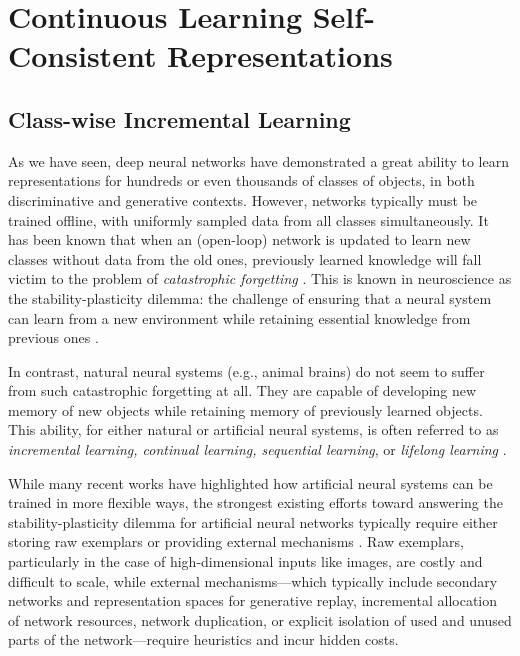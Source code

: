 \documentclass[../../book-main.tex]{subfiles}
\begin{document}
\section{Continuous Learning Self-Consistent Representations}
\label{sec:continuous}

\subsection{Class-wise Incremental Learning}
\label{sec:class-wise-incremental}

As we have seen, deep neural networks have demonstrated a great
ability to learn representations for hundreds or even thousands of
classes of objects, in both discriminative and generative contexts.
However, networks typically must be trained offline, with uniformly
sampled data from all classes simultaneously. It has been known that
when an (open-loop) network is updated to learn new classes without
data from the old ones, previously learned knowledge will fall victim
to the problem of {\em catastrophic forgetting}
\cite{McCloskey1989catastrophic}. This is known in neuroscience as
the stability-plasticity dilemma: the challenge of ensuring that a
neural system can learn from a new environment while retaining
essential knowledge from previous ones \cite{Grossberg1987CompetitiveLF}.

In contrast, natural neural systems (e.g., animal brains) do not seem
to suffer from such catastrophic forgetting at all. They are capable
of developing new memory of new objects while retaining memory of
previously learned objects. This ability, for either natural or
artificial neural systems, is often referred to as {\em incremental
learning, continual learning, sequential learning}, or {\em lifelong
learning} \cite{controlled-forgetting}.

While many recent works have highlighted how artificial neural
systems can be trained in more flexible ways, the strongest existing
efforts toward answering the stability-plasticity dilemma for
artificial neural networks typically require either storing raw
exemplars \cite{icarl,chaudhry2019tiny} or providing external
mechanisms \cite{EWC}. Raw exemplars, particularly in the case of
high-dimensional inputs like images, are costly and difficult to
scale, while external mechanisms---which typically include secondary
networks and representation spaces for generative replay, incremental
allocation of network resources, network duplication, or explicit
isolation of used and unused parts of the network---require
heuristics and incur hidden costs.
\end{document}
